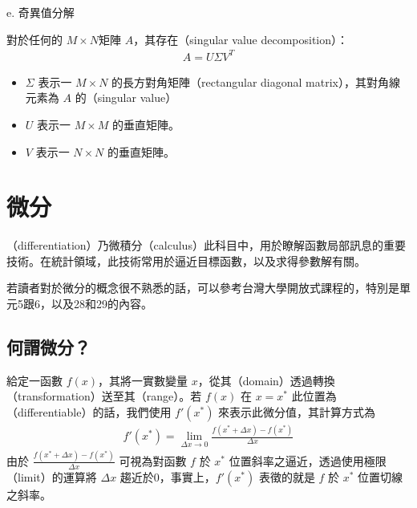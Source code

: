 \documentclass[letterpaper,10pt,english]{sphinxmanual}
\begin{document}
e. 奇異值分解

對於任何的 \(M \times N\)矩陣 \(A\)，其存在（singular value decomposition）：
\begin{equation*}
\begin{split}
A = U \Sigma V^T
\end{split}
\end{equation*}\begin{itemize}
\item {} 
\(\Sigma\) 表示一 \(M \times N\) 的長方對角矩陣（rectangular diagonal matrix），其對角線元素為 \(A\) 的（singular value）

\item {} 
\(U\) 表示一 \(M \times M\) 的垂直矩陣。

\item {} 
\(V\) 表示一 \(N \times N\) 的垂直矩陣。

\end{itemize}


\section{微分}
\label{\detokenize{notebook/mathematics-prerequisite:id11}}
（differentiation）乃微積分（calculus）此科目中，用於瞭解函數局部訊息的重要技術。在統計領域，此技術常用於逼近目標函數，以及求得參數解有關。

若讀者對於微分的概念很不熟悉的話，可以參考台灣大學開放式課程的，特別是單元5跟6，以及28和29的內容。


\subsection{何謂微分？}
\label{\detokenize{notebook/mathematics-prerequisite:id12}}
給定一函數 \(f(x)\)，其將一實數變量 \(x\)，從其（domain）透過轉換（transformation）送至其（range）。若 \(f(x)\) 在 \(x=x^*\) 此位置為（differentiable）的話，我們使用 \(f'(x^*)\) 來表示此微分值，其計算方式為
\begin{equation*}
\begin{split}
f'(x^*) = \lim_{\Delta x \to 0} \frac{f(x^* + \Delta x) - f(x^*)}{\Delta x}
\end{split}
\end{equation*}
由於 \(\frac{f(x^* + \Delta x) - f(x^*)}{\Delta x}\) 可視為對函數 \(f\) 於 \(x^*\) 位置斜率之逼近，透過使用極限（limit）的運算將 \(\Delta x\) 趨近於0，事實上，\(f'(x^*)\) 表徵的就是 \(f\) 於 \(x^*\) 位置切線之斜率。
\end{document}
